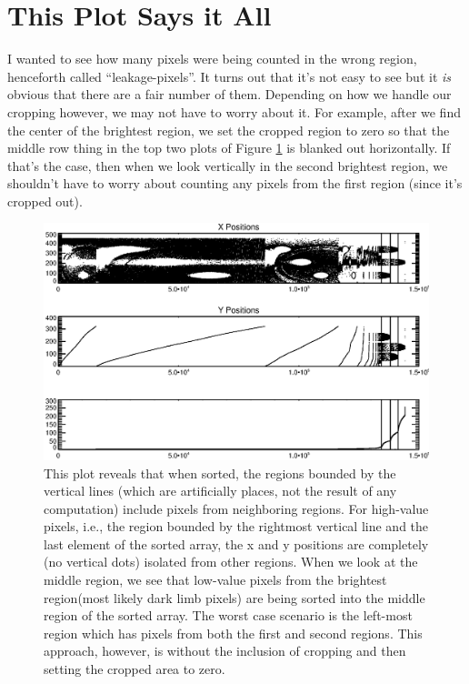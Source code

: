 \documentclass[10pt]{scrartcl}
\begin{document}

\section{This Plot Says it All} %
\label{sec:this_plot_says_it_all}

    I wanted to see how many pixels were being counted in the wrong region, henceforth called ``leakage-pixels''. It turns out that it's not easy to see but it \emph{is} obvious that there are a fair number of them. Depending on how we handle our cropping however, we may not have to worry about it. For example, after we find the center of the brightest region, we set the cropped region to zero so that the middle row thing in the top two plots of Figure \ref{saysitall} is blanked out horizontally. If that's the case, then when we look vertically in the second brightest region, we shouldn't have to worry about counting any pixels from the first region (since it's cropped out). 

\begin{figure}[!ht]
    \centering
    \includegraphics[width=.9\textwidth]{../plots_tables_images/saysitall.eps}
    \caption{This plot reveals that when sorted, the regions bounded by the vertical lines (which are artificially places, not the result of any computation) include pixels from neighboring regions. For high-value pixels, i.e., the region bounded by the rightmost vertical line and the last element of the sorted array, the x and y positions are completely (no vertical dots) isolated from other regions. When we look at the middle region, we see that low-value pixels from the brightest region(most likely dark limb pixels) are being sorted into the middle region of the sorted array. The worst case scenario is the left-most region which has pixels from both the first and second regions. This approach, however, is without the inclusion of cropping and then setting the cropped area to zero.}
    \label{saysitall}
\end{figure}
\end{document}
